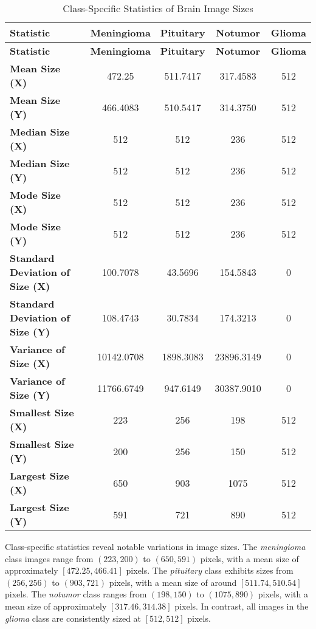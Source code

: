 \vspace{1cm}

\begin{longtable}{|l|c|c|c|c|}
\caption{Class-Specific Statistics of Brain Image Sizes}\\
\hline
\textbf{Statistic} & \textbf{Meningioma} & \textbf{Pituitary} & \textbf{Notumor} & \textbf{Glioma} \\
\hline
\endfirsthead
\hline
\textbf{Statistic} & \textbf{Meningioma} & \textbf{Pituitary} & \textbf{Notumor} & \textbf{Glioma} \\
\hline
\endhead
\hline
\endfoot
\endlastfoot
\textbf{Mean Size (X)} & 472.25 & 511.7417 & 317.4583 & 512 \\
\hline
\textbf{Mean Size (Y)} & 466.4083 & 510.5417 & 314.3750 & 512 \\
\hline
\textbf{Median Size (X)} & 512 & 512 & 236 & 512 \\
\hline
\textbf{Median Size (Y)} & 512 & 512 & 236 & 512 \\
\hline
\textbf{Mode Size (X)} & 512 & 512 & 236 & 512 \\
\hline
\textbf{Mode Size (Y)} & 512 & 512 & 236 & 512 \\
\hline
\textbf{Standard Deviation of Size (X)} & 100.7078 & 43.5696 & 154.5843 & 0 \\
\hline
\textbf{Standard Deviation of Size (Y)} & 108.4743 & 30.7834 & 174.3213 & 0 \\
\hline
\textbf{Variance of Size (X)} & 10142.0708 & 1898.3083 & 23896.3149 & 0 \\
\hline
\textbf{Variance of Size (Y)} & 11766.6749 & 947.6149 & 30387.9010 & 0 \\
\hline
\textbf{Smallest Size (X)} & 223 & 256 & 198 & 512 \\
\hline
\textbf{Smallest Size (Y)} & 200 & 256 & 150 & 512 \\
\hline
\textbf{Largest Size (X)} & 650 & 903 & 1075 & 512 \\
\hline
\textbf{Largest Size (Y)} & 591 & 721 & 890 & 512 \\
\hline
\end{longtable}

Class-specific statistics reveal notable variations in image sizes. The \textit{meningioma} class images range from $(223, 200)$ to $(650, 591)$ pixels, with a mean size of approximately $[472.25, 466.41]$ pixels. The \textit{pituitary} class exhibits sizes from $(256, 256)$ to $(903, 721)$ pixels, with a mean size of around $[511.74, 510.54]$ pixels. The \textit{notumor} class ranges from $(198, 150)$ to $(1075, 890)$ pixels, with a mean size of approximately $[317.46, 314.38]$ pixels. In contrast, all images in the \textit{glioma} class are consistently sized at $[512, 512]$ pixels.

